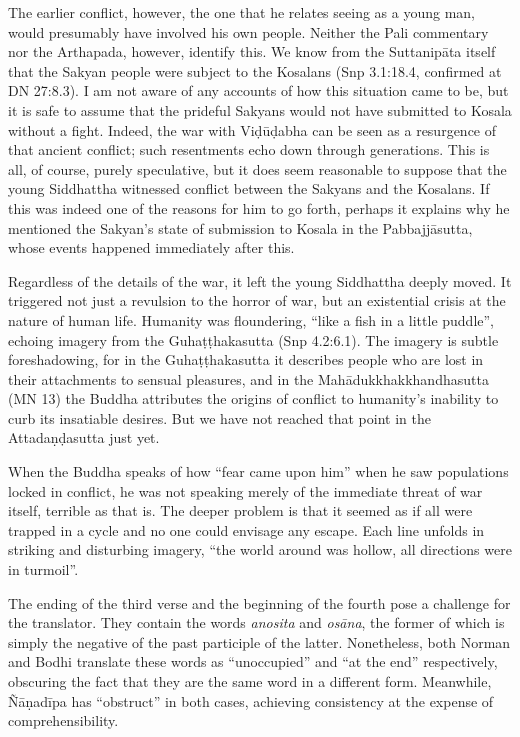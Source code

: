\documentclass[12pt,openany]{book}%
\begin{document}
The earlier conflict, however, the one that he relates seeing as a young man, would presumably have involved his own people. Neither the Pali commentary nor the Arthapada, however, identify this. We know from the \textsanskrit{Suttanipāta} itself that the Sakyan people were subject to the Kosalans (Snp 3.1:18.4, confirmed at DN 27:8.3). I am not aware of any accounts of how this situation came to be, but it is safe to assume that the prideful Sakyans would not have submitted to Kosala without a fight. Indeed, the war with \textsanskrit{Viḍūḍabha} can be seen as a resurgence of that ancient conflict; such resentments echo down through generations. This is all, of course, purely speculative, but it does seem reasonable to suppose that the young Siddhattha witnessed conflict between the Sakyans and the Kosalans. If this was indeed one of the reasons for him to go forth, perhaps it explains why he mentioned the Sakyan’s state of submission to Kosala in the \textsanskrit{Pabbajjāsutta}, whose events happened immediately after this.

Regardless of the details of the war, it left the young Siddhattha deeply moved. It triggered not just a revulsion to the horror of war, but an existential crisis at the nature of human life. Humanity was floundering, “like a fish in a little puddle”, echoing imagery from the \textsanskrit{Guhaṭṭhakasutta} (Snp 4.2:6.1). The imagery is subtle foreshadowing, for in the \textsanskrit{Guhaṭṭhakasutta} it describes people who are lost in their attachments to sensual pleasures, and in the \textsanskrit{Mahādukkhakkhandhasutta} (MN 13) the Buddha attributes the origins of conflict to humanity’s inability to curb its insatiable desires. But we have not reached that point in the \textsanskrit{Attadaṇḍasutta} just yet.

When the Buddha speaks of how “fear came upon him” when he saw populations locked in conflict, he was not speaking merely of the immediate threat of war itself, terrible as that is. The deeper problem is that it seemed as if all were trapped in a cycle and no one could envisage any escape. Each line unfolds in striking and disturbing imagery, “the world around was hollow, all directions were in turmoil”.

The ending of the third verse and the beginning of the fourth pose a challenge for the translator. They contain the words \textit{anosita} and \textit{\textsanskrit{osāna}}, the former of which is simply the negative of the past participle of the latter. Nonetheless, both Norman and Bodhi translate these words as “unoccupied” and “at the end” respectively, obscuring the fact that they are the same word in a different form. Meanwhile, \textsanskrit{Ñāṇadīpa} has “obstruct” in both cases, achieving consistency at the expense of comprehensibility.
\end{document}
